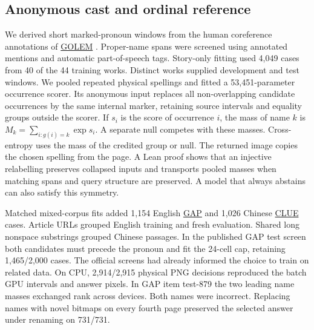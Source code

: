 \documentclass[12pt,a4paper]{article}
\providecommand{\DIFadd}[1]{{\protect\color{blue} \sf #1}} %
\begin{document}
\subsection*{\DIFadd{Anonymous cast and ordinal reference}}
\DIFadd{We derived short marked-pronoun windows from the human coreference annotations of }\href{https://aclanthology.org/2026.acl-short.39/}{\DIFadd{GOLEM}}\DIFadd{. Proper-name spans were screened using annotated mentions and automatic part-of-speech tags. Story-only fitting used 4,049 cases from 40 of the 44 training works. Distinct works supplied development and test windows. We pooled repeated physical spellings and fitted a 53,451-parameter occurrence scorer. Its anonymous input replaces all non-overlapping candidate occurrences by the same internal marker, retaining source intervals and equality groups outside the scorer. If $s_i$ is the score of occurrence $i$, the mass of name $k$ is $M_k=\sum_{i:g(i)=k}\exp s_i$. A separate null competes with these masses. Cross-entropy uses the mass of the credited group or null. The returned image copies the chosen spelling from the page. A Lean proof shows that an injective relabelling preserves collapsed inputs and transports pooled masses when matching spans and query structure are preserved. A model that always abstains can also satisfy this symmetry.
}

\DIFadd{Matched mixed-corpus fits added 1,154 English }\href{https://github.com/google-research-datasets/gap-coreference}{\DIFadd{GAP}} \DIFadd{and 1,026 Chinese }\href{https://github.com/CLUEbenchmark/CLUE}{\DIFadd{CLUE}} \DIFadd{cases. Article URLs grouped English training and fresh evaluation. Shared long nonspace substrings grouped Chinese passages. In the published GAP test screen both candidates must precede the pronoun and fit the 24-cell cap, retaining 1,465/2,000 cases. The official screens had already informed the choice to train on related data. On CPU, 2,914/2,915 physical PNG decisions reproduced the batch GPU intervals and answer pixels. In GAP item test-879 the two leading name masses exchanged rank across devices. Both names were incorrect. Replacing names with novel bitmaps on every fourth page preserved the selected answer under renaming on 731/731.
}
\end{document}
